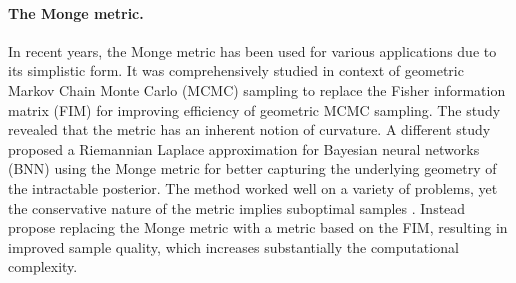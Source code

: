 
\paragraph{The Monge metric.} 
In recent years, the Monge metric has been used for various applications due to its simplistic form. It was comprehensively studied in context of geometric Markov Chain Monte Carlo (MCMC) sampling \cite{hartmann2022lagrangian} to replace the Fisher information matrix (FIM) for improving efficiency of geometric MCMC sampling. The study revealed that the metric has an inherent notion of curvature. A different study \cite{bergamin2024riemannian} proposed a Riemannian Laplace approximation for Bayesian neural networks (BNN) using the Monge metric for better capturing the underlying geometry of the intractable posterior. The method worked well on a variety of problems, yet the conservative nature of the metric implies suboptimal samples
\cite{yu2023riemannian}. Instead \citet{yu2023riemannian} propose replacing the Monge metric with a metric based on the FIM, resulting in improved sample quality, which increases substantially the computational complexity.